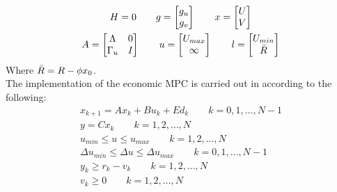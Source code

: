 \begin{equation}
    \begin{gathered}
        H=0 \qquad g=\begin{bmatrix} g_u\\g_v \end{bmatrix} \qquad x=\begin{bmatrix} U\\V \end{bmatrix} \\
        A=\begin{bmatrix} \Lambda & 0\\ \Gamma_u & I \end{bmatrix} \qquad
        u=\begin{bmatrix} U_{max}\\\infty \end{bmatrix} \qquad
         l=\begin{bmatrix} U_{min}\\ \Bar{R} \end{bmatrix}
    \end{gathered}
\end{equation}
Where $\Bar{R}=R-\phi x_0$.\\
The implementation of the economic MPC is carried out in according to the following:
\begin{equation}
    \begin{gathered}
        x_{k+1}=Ax_k+Bu_k+Ed_k\qquad k=0,1,\dots,N-1\\
        y=Cx_k\qquad k=1,2,\dots,N\\
        u_{min}\leq u\leq u_{max}\qquad k=1,2,\dots,N\\
        \Delta u_{min}\leq \Delta u\leq \Delta u_{max}\qquad k=0,1,\dots,N-1\\
        y_k\geq r_k-v_k\qquad k=1,2,\dots,N\\
        v_k\geq 0\qquad k=1,2,\dots,N\\
    \end{gathered}
\end{equation}
